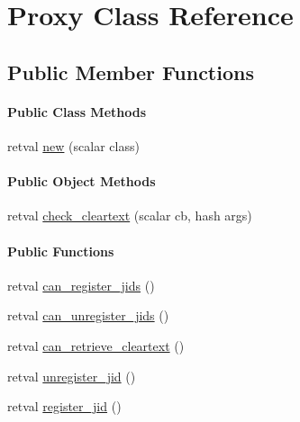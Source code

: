 \hypertarget{class_d_jabberd_1_1_authen_1_1_proxy}{
\section{\-Proxy \-Class \-Reference}
\label{class_d_jabberd_1_1_authen_1_1_proxy}
}
\subsection*{\-Public \-Member \-Functions}
\begin{Indent}\paragraph*{\-Public \-Class \-Methods}
\begin{DoxyCompactItemize}
\item 
retval \hyperlink{class_d_jabberd_1_1_authen_1_1_proxy_a04de1185dad12c1c24cac9235c2bbeff}{new} (scalar class)
\end{DoxyCompactItemize}
\end{Indent}
\begin{Indent}\paragraph*{\-Public \-Object \-Methods}
\begin{DoxyCompactItemize}
\item 
retval \hyperlink{class_d_jabberd_1_1_authen_1_1_proxy_a9606380d2395a217ce29d8c317a8d96c}{check\-\_\-cleartext} (scalar cb, hash args)
\end{DoxyCompactItemize}
\end{Indent}
\begin{Indent}\paragraph*{\-Public \-Functions}
\begin{DoxyCompactItemize}
\item 
retval \hyperlink{class_d_jabberd_1_1_authen_1_1_proxy_abeeb1f02175ebcd9354b1d9999deb337}{can\-\_\-register\-\_\-jids} ()
\item 
retval \hyperlink{class_d_jabberd_1_1_authen_1_1_proxy_a542031db9d71f4fe36b0025c75ed956e}{can\-\_\-unregister\-\_\-jids} ()
\item 
retval \hyperlink{class_d_jabberd_1_1_authen_1_1_proxy_aec5408ad749cef9d7aad2d9eebf32686}{can\-\_\-retrieve\-\_\-cleartext} ()
\item 
retval \hyperlink{class_d_jabberd_1_1_authen_1_1_proxy_a1976343b9e897f27d42bffd0a58cd8b6}{unregister\-\_\-jid} ()
\item 
retval \hyperlink{class_d_jabberd_1_1_authen_1_1_proxy_a93aeb5ea43a00c5d5365a7305d06224f}{register\-\_\-jid} ()
\end{DoxyCompactItemize}
\end{Indent}


